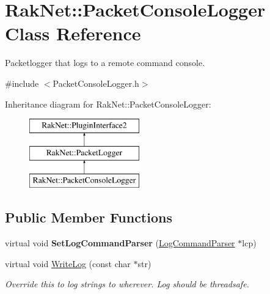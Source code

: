 \hypertarget{class_rak_net_1_1_packet_console_logger}{\section{Rak\-Net\-:\-:Packet\-Console\-Logger Class Reference}
\label{class_rak_net_1_1_packet_console_logger}
}


Packetlogger that logs to a remote command console.  




{\ttfamily \#include $<$Packet\-Console\-Logger.\-h$>$}

Inheritance diagram for Rak\-Net\-:\-:Packet\-Console\-Logger\-:\begin{figure}[H]
\begin{center}
\leavevmode
\includegraphics[height=3.000000cm]{class_rak_net_1_1_packet_console_logger}
\end{center}
\end{figure}
\subsection*{Public Member Functions}
\begin{DoxyCompactItemize}
\item 
\hypertarget{class_rak_net_1_1_packet_console_logger_a4681dc3e349fc6ec0d50071f10fb2b87}{virtual void {\bfseries Set\-Log\-Command\-Parser} (\hyperlink{class_rak_net_1_1_log_command_parser}{Log\-Command\-Parser} $\ast$lcp)}\label{class_rak_net_1_1_packet_console_logger_a4681dc3e349fc6ec0d50071f10fb2b87}

\item 
\hypertarget{class_rak_net_1_1_packet_console_logger_aee04e1f12c1e9090bf35a5ffef2dba55}{virtual void \hyperlink{class_rak_net_1_1_packet_console_logger_aee04e1f12c1e9090bf35a5ffef2dba55}{Write\-Log} (const char $\ast$str)}\label{class_rak_net_1_1_packet_console_logger_aee04e1f12c1e9090bf35a5ffef2dba55}

\begin{DoxyCompactList}\small\item\em Override this to log strings to wherever. Log should be threadsafe. \end{DoxyCompactList}\end{DoxyCompactItemize}
